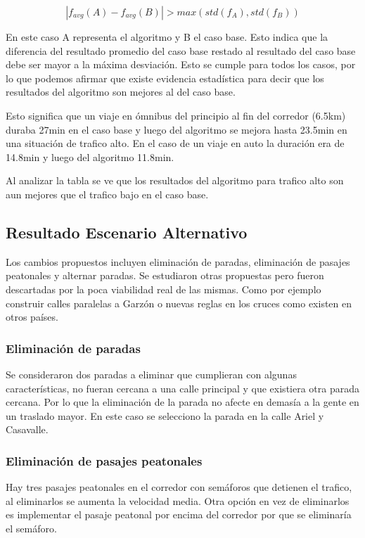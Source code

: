 \begin{equation}
\label{eq:funcion_significancia}
\left |f_{avg}(A) - f_{avg}(B)  \right | > max(std(f_A),std(f_B))
\end{equation}

En este caso A representa el algoritmo y B el caso base. Esto indica que la diferencia del resultado promedio del caso base restado al resultado del caso base debe ser mayor a la máxima desviación.
Esto se cumple para todos los casos, por lo que podemos afirmar que existe evidencia estadística para decir que los resultados del algoritmo son mejores al del caso base.


Esto significa que un viaje en ómnibus del principio al fin del corredor (6.5km) duraba 27min en el caso base y luego del algoritmo se mejora hasta 23.5min en una situación de trafico alto. En el caso de un viaje en auto la duración era de 14.8min y luego del algoritmo 11.8min.

Al analizar la tabla se ve que los resultados del algoritmo para trafico alto son aun mejores que el trafico bajo en el caso base. 





\subsection{Resultado Escenario Alternativo}
Los cambios propuestos incluyen eliminación de paradas, eliminación de pasajes peatonales y alternar paradas. Se estudiaron otras propuestas pero fueron descartadas por la poca viabilidad real de las mismas. Como por ejemplo construir calles paralelas a Garzón o nuevas reglas en los cruces como existen en otros países.




\subsubsection{Eliminación de paradas}
Se consideraron dos paradas a eliminar que cumplieran con algunas características, no fueran cercana a una calle principal y que existiera otra parada cercana. Por lo que la eliminación de la parada no afecte en demasía a la gente en un traslado mayor.
En este caso se selecciono la parada en la calle Ariel y Casavalle.



\subsubsection{Eliminación de pasajes peatonales}
Hay tres pasajes peatonales en el corredor con semáforos que detienen el trafico, al eliminarlos se aumenta la velocidad media. Otra opción en vez de eliminarlos es implementar el pasaje peatonal por encima del corredor por que se eliminaría el semáforo.


